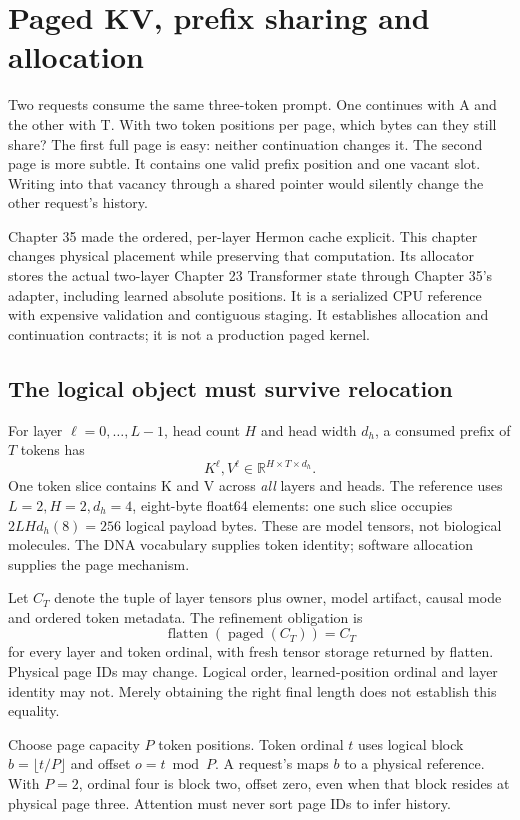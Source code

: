 \chapter{Paged KV, prefix sharing and allocation}
\label{evod36:chapter}

Two requests consume the same three-token prompt. One continues with A and
the other with T. With two token positions per page, which bytes can they
still share? The first full page is easy: neither continuation changes it.
The second page is more subtle. It contains one valid prefix position and
one vacant slot. Writing into that vacancy through a shared pointer would
silently change the other request's history.

Chapter 35 made the ordered, per-layer Hermon cache explicit. This chapter
changes physical placement while preserving that computation. Its allocator
stores the actual two-layer Chapter 23 Transformer state through Chapter 35's
adapter, including learned absolute positions. It is a serialized CPU
reference with expensive validation and contiguous staging. It establishes
allocation and continuation contracts; it is not a production paged kernel.

\section{The logical object must survive relocation}
\label{evod36:invariant}
For layer $\ell=0,\ldots,L-1$, head count $H$ and head width $d_h$, a
consumed prefix of $T$ tokens has
\[
 K^\ell,V^\ell\in\mathbb R^{H\times T\times d_h}.
\]
One token slice contains K and V across \emph{all} layers and heads. The
reference uses $L=2,H=2,d_h=4$, eight-byte float64 elements: one such slice
occupies $2LHd_h(8)=256$ logical payload bytes. These are model tensors,
not biological molecules. The DNA vocabulary supplies token identity;
software allocation supplies the page mechanism.

Let $C_T$ denote the tuple of layer tensors plus owner, model artifact,
causal mode and ordered token metadata. The refinement obligation is
\[
 \operatorname{flatten}(\operatorname{paged}(C_T))=C_T
\]
for every layer and token ordinal, with fresh tensor storage returned by
flatten. Physical page IDs may change. Logical order, learned-position
ordinal and layer identity may not. Merely obtaining the right final
length does not establish this equality.

Choose page capacity $P$ token positions. Token ordinal $t$ uses logical
block $b=\lfloor t/P\rfloor$ and offset $o=t\bmod P$. A request's
 maps $b$ to a physical reference. With $P=2$, ordinal
four is block two, offset zero, even when that block resides at physical
page three. Attention must never sort page IDs to infer history.

